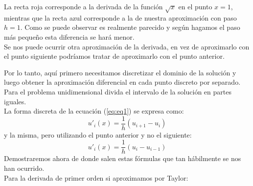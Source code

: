 \documentclass[12pt]{article}
\begin{document}
La recta roja corresponde a la derivada de la función $\sqrt{x}$ en el punto $x=1$,
mientras que la recta azul corresponde a la de nuestra aproximación con paso $h=1$.
Como se puede observar es realmente parecido y según hagamos el paso más pequeño 
esta diferencia se hará menor.\\

Se nos puede ocurrir otra aproximación de la derivada, en vez de aproximarlo con el punto siguiente podríamos tratar de aproximarlo con el punto anterior.\\

\begin{center}
\end{center}

Por lo tanto, aquí primero necesitamos discretizar el dominio de la solución y 
luego obtener la aproximación diferencial en cada punto discreto por separado. 
Para el problema unidimensional divida el intervalo de la solución en partes iguales.\\

La forma discreta de la ecuación (\ref{eq:eq1}) se expresa como: 								
\begin{equation}
u'_i(x)=\frac{1}{h}(u_{i+1} - u_i)
\end{equation}
y la misma, pero utilizando el punto anterior y no el siguiente:
\begin{equation}
u'_i(x)=\frac{1}{h}(u_i-u_{i-1})
\end{equation}
Demostraremos ahora de donde salen estas fórmulas que tan hábilmente se nos han ocurrido.\\

Para la derivada de primer orden si aproximamos por Taylor:
\end{document}
